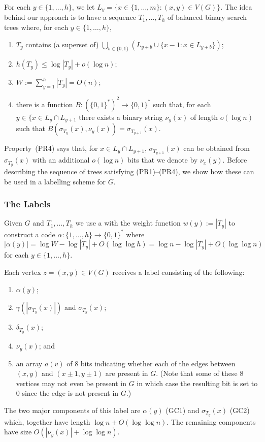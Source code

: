 \documentclass[kpfonts]{patmorin}
\begin{document}
For each $y\in\{1,\ldots,h\}$, we let $L_y=\{x\in\{1,\ldots,m\}:(x,y)\in V(G)\}$.  The idea behind our approach is to have a sequence $T_1,\ldots,T_h$ of balanced binary search trees where, for each $y\in\{1,\ldots,h\}$,
\begin{enumerate}[(PR1)]
  \item $T_y$ contains (a superset of) $\bigcup_{b\in\{0,1\}} (L_{y+b}\cup \{x-1:x\in L_{y+b}\})$;
  
  \item $h(T_y)\le\log |T_y| + o(\log n)$;
  
  \item $W:=\sum_{y=1}^h |T_y| = O(n)$;
  
  \item there is a function $B:(\{0,1\}^*)^2\to\{0,1\}^*$ such that, for each $y\in\{x\in L_y\cap L_{y+1}$ there exists a binary string $\nu_y(x)$ of length $o(\log n)$ such that $B(\sigma_{T_{y}}(x), \nu_y(x))=\sigma_{T_{y+1}}(x)$.
\end{enumerate}

Property~(PR4) says that, for $x\in L_y\cap L_{y+1}$, $\sigma_{T_{y+1}}(x)$ can be obtained from $\sigma_{T_{y}}(x)$ with an additional $o(\log n)$ bits that we denote by $\nu_x(y)$.  Before describing the sequence of trees satisfying (PR1)--(PR4), we show how these can be used in a labelling scheme for $G$. 


\subsubsection{The Labels}

Given $G$ and $T_{1},\ldots,T_h$ we use a  with the weight function $w(y):=|T_y|$ to construct a code $\alpha:\{1,\ldots,h\}\to\{0,1\}^*$ where
\[  
  |\alpha(y)| = \log W-\log|T_y| + O(\log\log h) = \log n - \log|T_y| + O(\log\log n)
\]
for each $y\in\{1,\ldots,h\}$.  

Each vertex $z=(x,y)\in V(G)$ receives a label consisting of the following:  
\begin{enumerate}[(GC1)]
  \item $\alpha(y)$;
  \item $\gamma(|\sigma_{T_y}(x)|)$ and $\sigma_{T_y}(x)$;    
  \item $\delta_{T_y}(x)$;
  \item $\nu_y(x)$; and
  \item an array $a(v)$ of $8$ bits indicating whether each of the edges between $(x,y)$ and $(x\pm 1,y\pm 1)$ are present in $G$.  (Note that some of these 8 vertices may not even be present in $G$ in which case the resulting bit is set to 0 since the edge is not present in $G$.)
\end{enumerate}
The two major components of this label are $\alpha(y)$ (GC1) and $\sigma_{T_y}(x)$ (GC2) which, together have length $\log n + O(\log\log n)$.  The remaining components have size $O(|\nu_y(x)|+\log\log n)$.  
\end{document}
